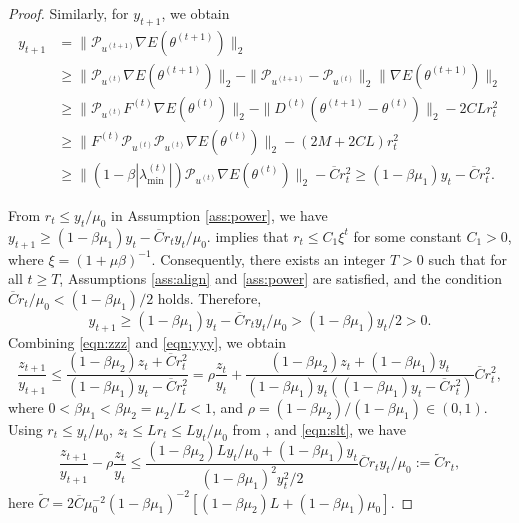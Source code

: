 \documentclass[final]{siamart251216}
\begin{document}
\begin{proof}
Similarly, for $y_{t+1}$, we obtain 
\begin{equation}\label{eqn:yyy}
\begin{aligned}
y_{t+1}&=
\|\mathcal{P}_{u^{(t+1)}}\nabla E(\theta^{(t+1)})\|_{2}
\\
&\geqslant
\|\mathcal{P}_{u^{(t)}}\nabla E(\theta^{(t+1)})\|_{2}-
\|\mathcal{P}_{u^{(t+1)}}-\mathcal{P}_{u^{(t)}}\|_{2}
\|\nabla E(\theta^{(t+1)})\|_{2}
\\
&\geqslant
\|\mathcal{P}_{u^{(t)}}F^{(t)}
\nabla E(\theta^{(t)})\|_{2}
-\|D^{(t)}(\theta^{(t+1)}-\theta^{(t)})\|_{2}
- 2CLr_{t}^{2}
\\
&\geqslant
\|F^{(t)}\mathcal{P}_{u^{(t)}} \mathcal{P}_{u^{(t)}}\nabla E(\theta^{(t)})\|_{2}
- (2M+2CL)r_{t}^{2}
\\
&\geqslant
\|(1-\beta|\lambda_{\min}^{(t)}|)\mathcal{P}_{u^{(t)}}\nabla E(\theta^{(t)})\|_{2}- \overline{C}r_{t}^{2}
\geqslant
(1-\beta\mu_1)y_{t}-\overline{C}r_{t}^{2}.
\end{aligned}
\end{equation}


From $r_t\leqslant y_t/\mu_0$ in Assumption \ref{ass:power}, we have 
$y_{t+1} \geqslant 
(1-\beta\mu_1)y_t  -\overline{C}r_{t}y_t/\mu_0$.
 implies that  $r_t \leqslant C_1 \xi^t$ for some constant $C_1>0$, where $\xi=(1+\mu\beta)^{-1}$. 
Consequently, there exists an integer $T>0$ such that for all $t\geqslant T$, Assumptions \ref{ass:align} and \ref{ass:power} are satisfied, and the condition $\overline{C}r_{t}/\mu_0 < (1-\beta\mu_1)/2$ holds. Therefore, 
\begin{equation}\label{eqn:slt}
y_{t+1} \geqslant
(1-\beta\mu_1)y_t  -\overline{C}r_{t}y_t/\mu_0
> (1-\beta\mu_1) y_t/2 > 0.
\end{equation}
Combining \eqref{eqn:zzz} and \eqref{eqn:yyy}, we obtain
\begin{equation}
\frac{z_{t+1}}{y_{t+1}} \leqslant \frac{(1-\beta\mu_2)z_t + \overline{C}r_t^2}{(1-\beta\mu_1)y_t - \overline{C}r_t^2}
=\rho\frac{z_t}{y_t}
+ 
\frac{(1-\beta\mu_2)z_t + (1-\beta\mu_1)y_t}
{(1-\beta\mu_1)y_t((1-\beta\mu_1)y_t - \overline{C}r_t^2)}\overline{C}r_t^2
,
\end{equation}
where $0 < \beta\mu_1<\beta\mu_2 = {\mu_2}/{L} < 1$, and 
$\rho=(1-\beta\mu_2)/(1-\beta\mu_1)\in(0,1)$. \\
Using $r_t\leqslant y_t/\mu_0$, $z_t \leqslant L r_t \leqslant L y_t/\mu_0$ from , and \eqref{eqn:slt}, we have
\begin{equation}
\frac{z_{t+1}}{y_{t+1}} - \rho\frac{z_t}{y_t} \leqslant
\frac{(1-\beta\mu_2)Ly_t/\mu_0 + (1-\beta\mu_1)y_t}
{(1-\beta\mu_1)^2y_t^2/2}\overline{C}r_t y_t/\mu_0
:=\tilde{C} r_t,
\end{equation}
here $\tilde{C}=2\overline{C}\mu_0^{-2}(1-\beta\mu_1)^{-2}[(1-\beta\mu_2)L+(1-\beta\mu_1)\mu_0]  $.


\end{proof}
\end{document}
